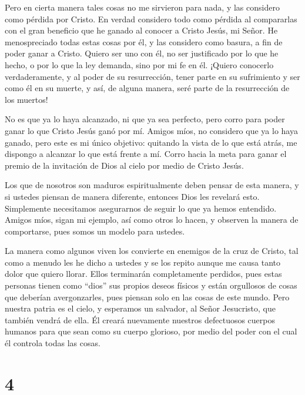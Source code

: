  Pero en cierta manera tales cosas no me sirvieron para
nada, y las considero como pérdida por Cristo.  En verdad
considero todo como pérdida al compararlas con el gran beneficio que he
ganado al conocer a Cristo Jesús, mi Señor. He menospreciado todas estas
cosas por él, y las considero como basura, a fin de poder ganar a
Cristo.  Quiero ser uno con él, no ser justificado por lo
que he hecho, o por lo que la ley demanda, sino por mi fe en él.
 ¡Quiero conocerlo verdaderamente, y al poder de su
resurrección, tener parte en su sufrimiento y ser como él en su muerte,
 y así, de alguna manera, seré parte de la resurrección de
los muertos!

 No es que ya lo haya alcanzado, ni que ya sea perfecto,
pero corro para poder ganar lo que Cristo Jesús ganó por mí.
 Amigos míos, no considero que ya lo haya ganado, pero este
es mi único objetivo: quitando la vista de lo que está atrás, me
dispongo a alcanzar lo que está frente a mí.  Corro hacia
la meta para ganar el premio de la invitación de Dios al cielo por medio
de Cristo Jesús.

 Los que de nosotros son maduros espiritualmente deben
pensar de esta manera, y si ustedes piensan de manera diferente,
entonces Dios les revelará esto.  Simplemente necesitamos
asegurarnos de seguir lo que ya hemos entendido.  Amigos
míos, sigan mi ejemplo, así como otros lo hacen, y observen la manera de
comportarse, pues somos un modelo para ustedes.

 La manera como algunos viven los convierte en enemigos de
la cruz de Cristo, tal como a menudo les he dicho a ustedes y se los
repito aunque me causa tanto dolor que quiero llorar. 
Ellos terminarán completamente perdidos, pues estas personas tienen como
``dios'' sus propios deseos físicos y están orgullosos de cosas que
deberían avergonzarles, pues piensan solo en las cosas de este mundo.
 Pero nuestra patria es el cielo, y esperamos un salvador,
al Señor Jesucristo, que también vendrá de ella.  Él creará
nuevamente nuestros defectuosos cuerpos humanos para que sean como su
cuerpo glorioso, por medio del poder con el cual él controla todas las
cosas.

\hypertarget{section-3}{%
\section{4}\label{section-3}}

